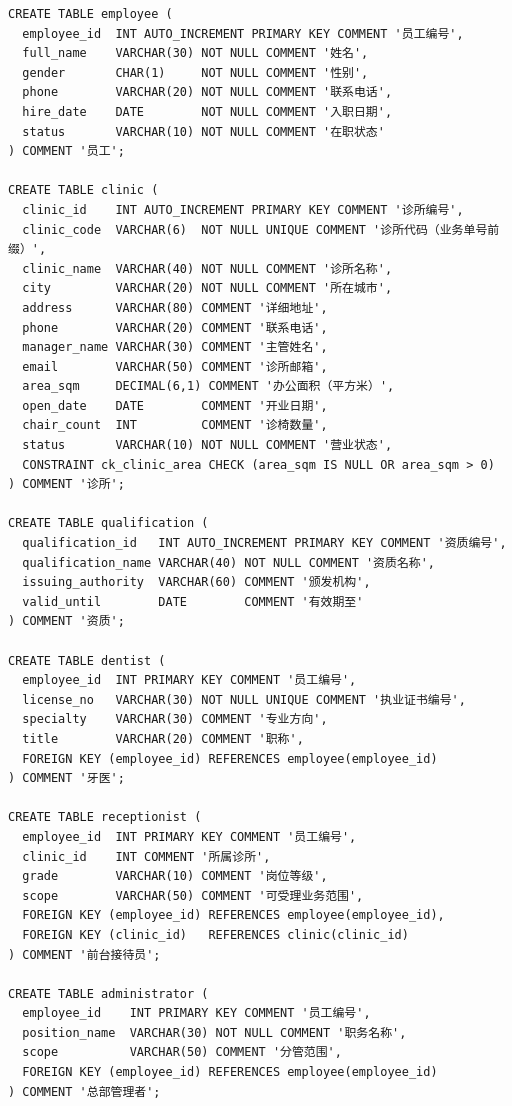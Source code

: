 \documentclass[11pt,a4paper]{ctexart}
\begin{document}
\begin{lstlisting}[style=sql]
CREATE TABLE employee (
  employee_id  INT AUTO_INCREMENT PRIMARY KEY COMMENT '员工编号',
  full_name    VARCHAR(30) NOT NULL COMMENT '姓名',
  gender       CHAR(1)     NOT NULL COMMENT '性别',
  phone        VARCHAR(20) NOT NULL COMMENT '联系电话',
  hire_date    DATE        NOT NULL COMMENT '入职日期',
  status       VARCHAR(10) NOT NULL COMMENT '在职状态'
) COMMENT '员工';

CREATE TABLE clinic (
  clinic_id    INT AUTO_INCREMENT PRIMARY KEY COMMENT '诊所编号',
  clinic_code  VARCHAR(6)  NOT NULL UNIQUE COMMENT '诊所代码（业务单号前缀）',
  clinic_name  VARCHAR(40) NOT NULL COMMENT '诊所名称',
  city         VARCHAR(20) NOT NULL COMMENT '所在城市',
  address      VARCHAR(80) COMMENT '详细地址',
  phone        VARCHAR(20) COMMENT '联系电话',
  manager_name VARCHAR(30) COMMENT '主管姓名',
  email        VARCHAR(50) COMMENT '诊所邮箱',
  area_sqm     DECIMAL(6,1) COMMENT '办公面积（平方米）',
  open_date    DATE        COMMENT '开业日期',
  chair_count  INT         COMMENT '诊椅数量',
  status       VARCHAR(10) NOT NULL COMMENT '营业状态',
  CONSTRAINT ck_clinic_area CHECK (area_sqm IS NULL OR area_sqm > 0)
) COMMENT '诊所';

CREATE TABLE qualification (
  qualification_id   INT AUTO_INCREMENT PRIMARY KEY COMMENT '资质编号',
  qualification_name VARCHAR(40) NOT NULL COMMENT '资质名称',
  issuing_authority  VARCHAR(60) COMMENT '颁发机构',
  valid_until        DATE        COMMENT '有效期至'
) COMMENT '资质';

CREATE TABLE dentist (
  employee_id  INT PRIMARY KEY COMMENT '员工编号',
  license_no   VARCHAR(30) NOT NULL UNIQUE COMMENT '执业证书编号',
  specialty    VARCHAR(30) COMMENT '专业方向',
  title        VARCHAR(20) COMMENT '职称',
  FOREIGN KEY (employee_id) REFERENCES employee(employee_id)
) COMMENT '牙医';

CREATE TABLE receptionist (
  employee_id  INT PRIMARY KEY COMMENT '员工编号',
  clinic_id    INT COMMENT '所属诊所',
  grade        VARCHAR(10) COMMENT '岗位等级',
  scope        VARCHAR(50) COMMENT '可受理业务范围',
  FOREIGN KEY (employee_id) REFERENCES employee(employee_id),
  FOREIGN KEY (clinic_id)   REFERENCES clinic(clinic_id)
) COMMENT '前台接待员';

CREATE TABLE administrator (
  employee_id    INT PRIMARY KEY COMMENT '员工编号',
  position_name  VARCHAR(30) NOT NULL COMMENT '职务名称',
  scope          VARCHAR(50) COMMENT '分管范围',
  FOREIGN KEY (employee_id) REFERENCES employee(employee_id)
) COMMENT '总部管理者';


\end{lstlisting}
\end{document}

